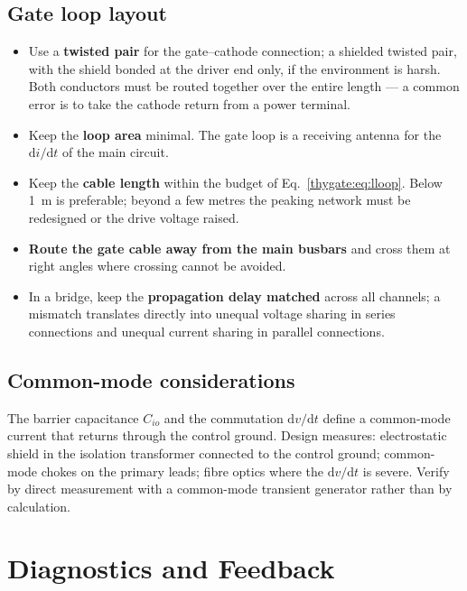 \subsection{Gate loop layout}

\begin{itemize}
  \item Use a \textbf{twisted pair} for the gate--cathode connection; a shielded
        twisted pair, with the shield bonded at the driver end only, if the
        environment is harsh. Both conductors must be routed together over the
        entire length --- a common error is to take the cathode return from a power
        terminal.
  \item Keep the \textbf{loop area} minimal. The gate loop is a receiving antenna
        for the $\mathrm{d}i/\mathrm{d}t$ of the main circuit.
  \item Keep the \textbf{cable length} within the budget of
        Eq.~\eqref{thygate:eq:lloop}. Below \SI{1}{\metre} is preferable; beyond a few
        metres the peaking network must be redesigned or the drive voltage raised.
  \item \textbf{Route the gate cable away from the main busbars} and cross them at
        right angles where crossing cannot be avoided.
  \item In a bridge, keep the \textbf{propagation delay matched} across all
        channels; a mismatch translates directly into unequal voltage sharing in
        series connections and unequal current sharing in parallel connections.
\end{itemize}

\subsection{Common-mode considerations}

The barrier capacitance $C_{io}$ and the commutation $\mathrm{d}v/\mathrm{d}t$
define a common-mode current that returns through the control ground. Design
measures: electrostatic shield in the isolation transformer connected to the
control ground; common-mode chokes on the primary leads; fibre optics where the
$\mathrm{d}v/\mathrm{d}t$ is severe. Verify by direct measurement with a
common-mode transient generator rather than by calculation.

\section{Diagnostics and Feedback}

